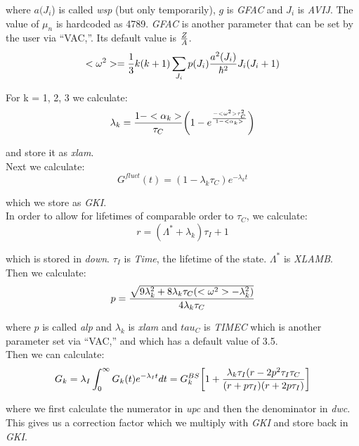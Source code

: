 \noindent where $a(J_i$) is called {\em wsp} (but only temporarily), $g$ is
{\em GFAC} and $J_i$ is {\em AVIJ}. The value of $\mu_n$ is hardcoded as
4789. {\em GFAC} is another parameter that can be set by the user via
``VAC,''. Its default value is $Z \over A$.\\

\begin{equation}
<\omega^2> = {1 \over 3} k (k + 1) \sum_{J_i} p(J_i) {a^2(J_i) \over
\hbar^2} J_i (J_i + 1)
\end{equation}

\noindent For k = 1, 2, 3 we calculate:\\

\begin{equation}
\lambda_k = { 1 - <\alpha_k> \over \tau_C}
\bigg(1 - e^{- <\omega^2> \tau_C^2\over 1 - <\alpha_k>}\bigg)
\end{equation}

and store it as {\em xlam}.\\

\noindent Next we calculate:\\

\begin{equation}
G^{fluct}(t) = (1 - \lambda_k \tau_C) e^{-\lambda_k t}
\end{equation}

\noindent which we store as {\em GKI}.\\

\noindent In order to allow for lifetimes of comparable order to $\tau_C$,
we calculate:\\

\begin{equation}
r = (\Lambda^* + \lambda_k) \tau_I + 1
\end{equation}

\noindent which is stored in {\em down}. $\tau_I$ is {\em Time}, the
lifetime of the state. $\Lambda^*$ is {\em XLAMB}.\\

\noindent Then we calculate:\\

\begin{equation}
p = {\sqrt{9 \lambda_k^2 + 8\lambda_k\tau_C (<\omega^2> - \lambda_k^2)} \over
4 \lambda_k \tau_C}
\end{equation}

\noindent where $p$ is called {\em alp} and $\lambda_k$ is {\em xlam} and
$tau_C$ is {\em TIMEC} which is another parameter set via ``VAC,'' and which
has a default value of 3.5.\\

\noindent Then we can calculate:\\

\begin{equation}
G_k = \lambda_I \int_0^\infty G_k(t) e^{-\lambda_I t} dt =
G_k^{BS} \bigg[ 1 + 
{\lambda_k \tau_I (r - 2 p^2 \tau_I \tau_C \over
(r + p \tau_I)(r + 2 p \tau_I)}\bigg]
\end{equation}

\noindent where we first calculate the numerator in {\em upc} and then the
denominator in {\em dwc}. This gives us a correction factor which we
multiply with {\em GKI} and store back in {\em GKI}.\\
